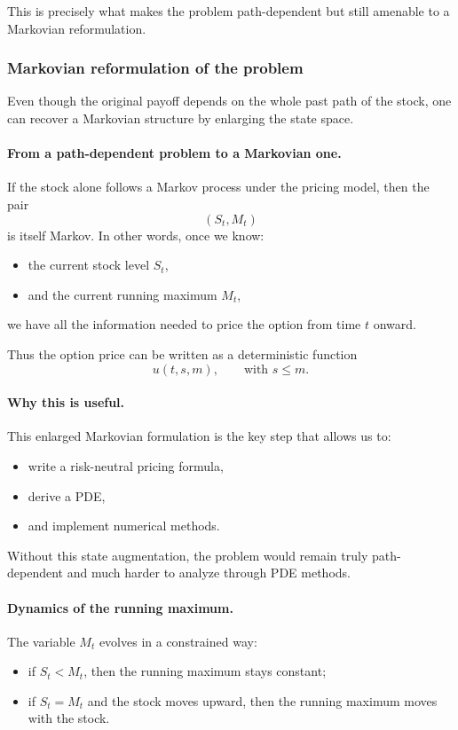 \documentclass[11pt]{article}
\theoremstyle{plain}
\theoremstyle{definition}
\theoremstyle{remark}
\begin{document}
This is precisely what makes the problem path-dependent but still
amenable to a Markovian reformulation.

\subsubsection{Markovian reformulation of the problem}

Even though the original payoff depends on the whole past path of the
stock, one can recover a Markovian structure by enlarging the state
space.

\paragraph{From a path-dependent problem to a Markovian one.}
If the stock alone follows a Markov process under the pricing model, then
the pair
\[
(S_t,M_t)
\]
is itself Markov.
In other words, once we know:
\begin{itemize}[leftmargin=1.4em]
    \item the current stock level \(S_t\),
    \item and the current running maximum \(M_t\),
\end{itemize}
we have all the information needed to price the option from time \(t\)
onward.

Thus the option price can be written as a deterministic function
\[
u(t,s,m),
\qquad \text{with } s\le m.
\]

\paragraph{Why this is useful.}
This enlarged Markovian formulation is the key step that allows us to:
\begin{itemize}[leftmargin=1.4em]
    \item write a risk-neutral pricing formula,
    \item derive a PDE,
    \item and implement numerical methods.
\end{itemize}

Without this state augmentation, the problem would remain truly
path-dependent and much harder to analyze through PDE methods.

\paragraph{Dynamics of the running maximum.}
The variable \(M_t\) evolves in a constrained way:
\begin{itemize}[leftmargin=1.4em]
    \item if \(S_t<M_t\), then the running maximum stays constant;
    \item if \(S_t=M_t\) and the stock moves upward, then the running
    maximum moves with the stock.
\end{itemize}
\end{document}
